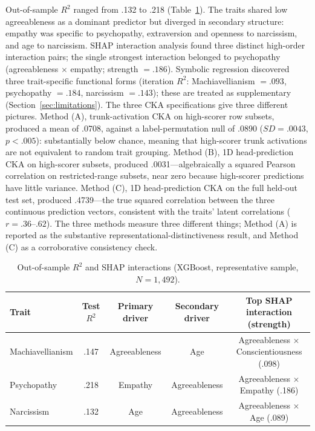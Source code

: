 \documentclass[11pt,twocolumn]{article}
\begin{document}
Out-of-sample $R^2$ ranged from .132 to .218 (Table~\ref{tab:xgb}). The traits shared low agreeableness as a dominant predictor but diverged in secondary structure: empathy was specific to psychopathy, extraversion and openness to narcissism, and age to narcissism. SHAP interaction analysis found three distinct high-order interaction pairs; the single strongest interaction belonged to psychopathy (agreeableness $\times$ empathy; strength $= .186$). Symbolic regression discovered three trait-specific functional forms (iteration $R^2$: Machiavellianism $= .093$, psychopathy $= .184$, narcissism $= .143$); these are treated as supplementary (Section~\ref{sec:limitations}). The three CKA specifications give three different pictures. Method (A), trunk-activation CKA on high-scorer row subsets, produced a mean of .0708, against a label-permutation null of .0890 ($SD = .0043$, $p < .005$): substantially below chance, meaning that high-scorer trunk activations are not equivalent to random trait grouping. Method (B), 1D head-prediction CKA on high-scorer subsets, produced .0031---algebraically a squared Pearson correlation on restricted-range subsets, near zero because high-scorer predictions have little variance. Method (C), 1D head-prediction CKA on the full held-out test set, produced .4739---the true squared correlation between the three continuous prediction vectors, consistent with the traits' latent correlations ($r = .36$--$.62$). The three methods measure three different things; Method (A) is reported as the substantive representational-distinctiveness result, and Method (C) as a corroborative consistency check.

\begin{table}[!t]
\centering
\caption{Out-of-sample $R^2$ and SHAP interactions (XGBoost, representative sample, $N = 1{,}492$).}
\label{tab:xgb}
\small
\begin{tabular}{lcccc}
\toprule
Trait & Test $R^2$ & Primary driver & Secondary driver & Top SHAP interaction (strength) \\
\midrule
Machiavellianism & .147 & Agreeableness & Age            & Agreeableness $\times$ Conscientiousness (.098) \\
Psychopathy      & .218 & Empathy       & Agreeableness  & Agreeableness $\times$ Empathy (.186) \\
Narcissism       & .132 & Age           & Agreeableness  & Agreeableness $\times$ Age (.089) \\
\bottomrule
\end{tabular}
\end{table}
\end{document}
